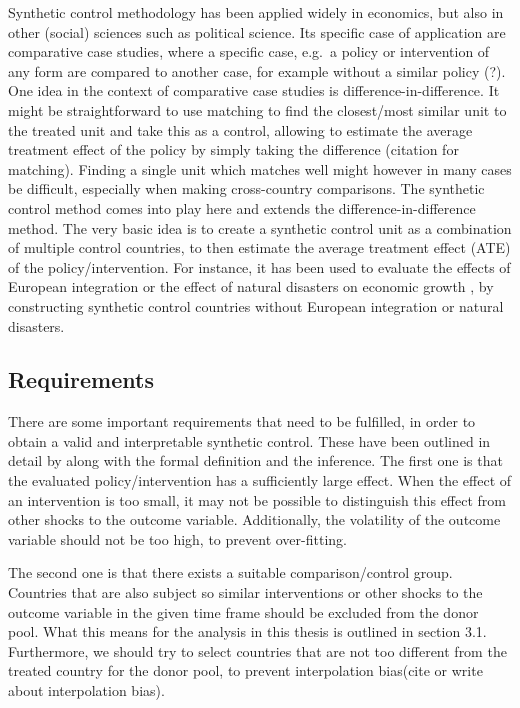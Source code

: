 \documentclass{scrbook}
\begin{document}
Synthetic control methodology has been applied widely in economics, but
also in other (social) sciences such as political science. Its specific
case of application are comparative case studies, where a specific case,
e.g.~a policy or intervention of any form are compared to another case,
for example without a similar policy (?). One idea in the context of
comparative case studies is difference-in-difference. It might be
straightforward to use matching to find the closest/most similar unit to
the treated unit and take this as a control, allowing to estimate the
average treatment effect of the policy by simply taking the difference
(citation for matching). Finding a single unit which matches well might
however in many cases be difficult, especially when making cross-country
comparisons. The synthetic control method comes into play here and
extends the difference-in-difference method. The very basic idea is to
create a synthetic control unit as a combination of multiple control
countries, to then estimate the average treatment effect (ATE) of the
policy/intervention. For instance, it has been used to evaluate the
effects of European integration \parencite{campos_institutional_2019} or
the effect of natural disasters on economic growth
\parencite{cavallo_catastrophic_2013}, by constructing synthetic control
countries without European integration or natural disasters.

\subsection*{Requirements}

There are some important requirements that need to be fulfilled, in
order to obtain a valid and interpretable synthetic control. These have
been outlined in detail by \textcite{abadie_using_2021} along with the
formal definition and the inference. The first one is that the evaluated
policy/intervention has a sufficiently large effect. When the effect of
an intervention is too small, it may not be possible to distinguish this
effect from other shocks to the outcome variable. Additionally, the
volatility of the outcome variable should not be too high, to prevent
over-fitting.

The second one is that there exists a suitable comparison/control group.
Countries that are also subject so similar interventions or other shocks
to the outcome variable in the given time frame should be excluded from
the donor pool. What this means for the analysis in this thesis is
outlined in section 3.1. Furthermore, we should try to select countries
that are not too different from the treated country for the donor pool,
to prevent interpolation bias(cite or write about interpolation bias).
\end{document}
